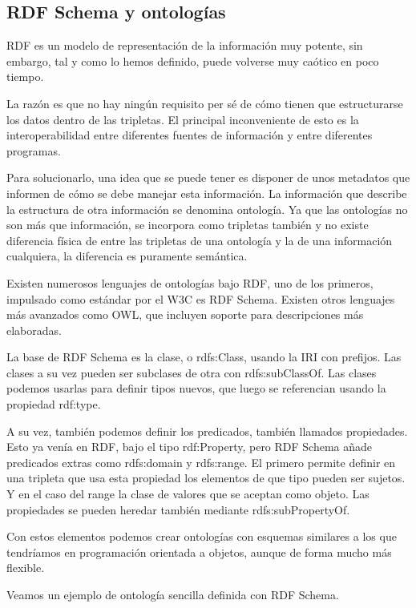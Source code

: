 \documentclass[12pt]{report} %
\begin{document}
\subsection{RDF Schema y ontologías}

RDF es un modelo de representación de la información muy potente, sin embargo, tal y como lo hemos definido, puede volverse muy caótico en poco tiempo.

La razón es que no hay ningún requisito per sé de cómo tienen que estructurarse los datos dentro de las tripletas. El principal inconveniente de esto es la interoperabilidad entre diferentes fuentes de información y entre diferentes programas.

Para solucionarlo, una idea que se puede tener es disponer de unos metadatos que informen de cómo se debe manejar esta información. La información que describe la estructura de otra información se denomina ontología. Ya que las ontologías no son más que información, se incorpora como tripletas también y no existe diferencia física de entre las tripletas de una ontología y la de una información cualquiera, la diferencia es puramente semántica. 

Existen numerosos lenguajes de ontologías bajo RDF, uno de los primeros, impulsado como estándar por el W3C es RDF Schema\cite{rdfs}. Existen otros lenguajes más avanzados como OWL\cite{owl}, que incluyen soporte para descripciones más elaboradas.

La base de RDF Schema es la clase, o rdfs:Class, usando la IRI con prefijos. Las clases a su vez pueden ser subclases de otra con rdfs:subClassOf. Las clases podemos usarlas para definir tipos nuevos, que luego se referencian usando la propiedad rdf:type.

A su vez, también podemos definir los predicados, también llamados propiedades. Esto ya venía en RDF, bajo el tipo rdf:Property, pero RDF Schema añade predicados extras como rdfs:domain y rdfs:range. El primero permite definir en una tripleta que usa esta propiedad los elementos de que tipo pueden ser sujetos. Y en el caso del range la clase de valores que se aceptan como objeto. Las propiedades se pueden heredar también mediante rdfs:subPropertyOf.

Con estos elementos podemos crear ontologías con esquemas similares a los que tendríamos en programación orientada a objetos, aunque de forma mucho más flexible.

Veamos un ejemplo de ontología sencilla definida con RDF Schema.
\end{document}

